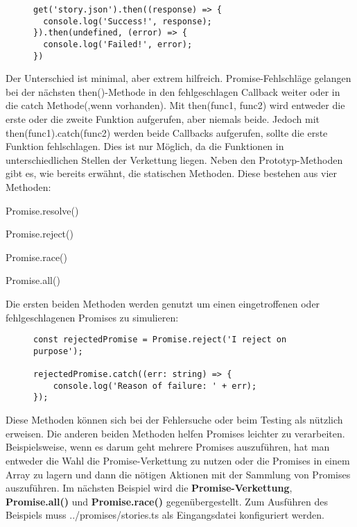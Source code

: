 \begin{figure}[H]
\begin{lstlisting}[basicstyle=\small]
get('story.json').then((response) => {
  console.log('Success!', response);
}).then(undefined, (error) => {
  console.log('Failed!', error);
})
\end{lstlisting}
\end{figure}

\noindent
Der Unterschied ist minimal, aber extrem hilfreich. Promise-Fehlschläge gelangen bei der nächsten then()-Methode in den fehlgeschlagen Callback weiter oder in die catch Methode(,wenn vorhanden). Mit then(func1, func2) wird entweder die erste oder die zweite Funktion aufgerufen, aber niemals beide. Jedoch mit then(func1).catch(func2) werden beide Callbacks aufgerufen, sollte die erste Funktion fehlschlagen. Dies ist nur Möglich, da die Funktionen in unterschiedlichen Stellen der Verkettung liegen. Neben den Prototyp-Methoden gibt es, wie bereits erwähnt, die statischen Methoden. Diese bestehen aus vier Methoden:

\begin{description}
\item Promise.resolve()
\item Promise.reject()
\item Promise.race()
\item Promise.all()
\end{description}

\noindent
Die ersten beiden Methoden werden genutzt um einen eingetroffenen oder fehlgeschlagenen Promises zu simulieren:

\begin{figure}[H]
\begin{lstlisting}[basicstyle=\small]
const rejectedPromise = Promise.reject('I reject on purpose');

rejectedPromise.catch((err: string) => {
    console.log('Reason of failure: ' + err);
});
\end{lstlisting}
\end{figure}

\noindent
Diese Methoden können sich bei der Fehlersuche oder beim Testing als nützlich erweisen. Die anderen beiden Methoden helfen Promises leichter zu verarbeiten. Beispielsweise, wenn es darum geht mehrere Promises auszuführen, hat man entweder die Wahl die Promise-Verkettung zu nutzen oder die Promises in einem Array zu lagern und dann die nötigen Aktionen mit der Sammlung von Promises auszuführen. Im nächsten Beispiel wird die \textbf{Promise-Verkettung}, \textbf{Promise.all()} und \textbf{Promise.race()} gegenübergestellt. Zum Ausführen des Beispiels muss ../promises/stories.ts als Eingangsdatei konfiguriert werden.


